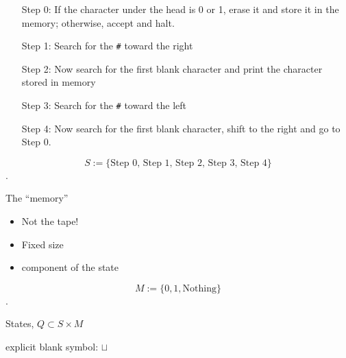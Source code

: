 \documentclass[
  ignorenonframetext,
]{beamer}
\date{}
\begin{document}
\begin{frame}[fragile]
\protect\hypertarget{the-steps}{}

\begin{enumerate}
\item[Step 0:] If the character under the head is 0 or 1, erase it and
store it in the memory; otherwise, accept and halt.\\\pause
\item[Step 1:] Search for the \texttt{\#} toward the right\\\pause
\item[Step 2:] Now search for the first blank character and print the
character stored in memory\\\pause
\item[Step 3:] Search for the \texttt{\#} toward the left\\\pause
\item[Step 4:] Now search for the first blank character, shift to the
right and go to Step 0.\pause
\end{enumerate}

\[S := \{\text{Step 0, Step 1, Step 2, Step 3, Step 4}\}\].

\end{frame}

\begin{frame}{The ``memory''}
\protect\hypertarget{the-memory}{}

\begin{itemize}
\item Not the tape!\pause
\item Fixed size\pause
\item component of the state\pause
\end{itemize}

\[M :=\{ 0, 1, \text{Nothing} \}\].

\end{frame}

\begin{frame}
\protect\hypertarget{the-states}{}


States,
$Q \subset S \times M$

explicit blank symbol: \(\sqcup\) 
\end{frame}
\end{document}
